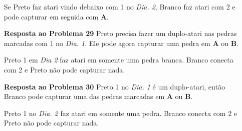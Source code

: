 \begin{itemize}
      Se Preto faz atari vindo debaixo com 1 no \emph{Dia. 2}, Branco faz atari com 2 e pode capturar em seguida com \textbf{A}.
  \item[\textbf{Resposta ao Problema 29}]
      Preto precisa fazer um duplo-atari  nas pedras marcadas com 1 no \emph{Dia. 1}. Ele pode agora capturar uma pedra em \textbf{A} ou \textbf{B}.

      Preto 1 em \emph{Dia 2} faz atari em somente uma pedra branca. Branco conecta com 2 e Preto não pode capturar nada.
  \item[\textbf{Resposta ao Problema 30}]
      Preto 1 no \emph{Dia. 1} é um duplo-atari, então Branco pode capturar uma das pedras marcadas em \textbf{A} ou \textbf{B}.
      
      Preto 1 no \emph{Dia. 2} faz atari em somente uma pedra. Branco conecta com 2 e Preto não pode capturar nada.
\end{itemize}